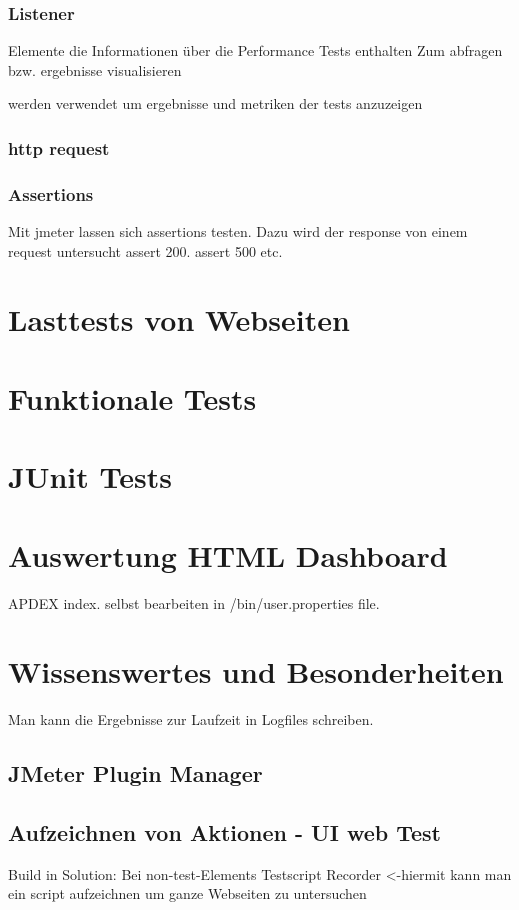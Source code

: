 \documentclass[a4paper,12pt]{article}
\begin{document}
\subsubsection{Listener}
Elemente die Informationen über die Performance Tests enthalten
Zum abfragen bzw. ergebnisse visualisieren

werden verwendet um ergebnisse und metriken der tests anzuzeigen

\subsubsection{http request}
\subsubsection{Assertions}
Mit jmeter lassen sich assertions testen. Dazu wird der response von einem request untersucht assert 200. assert 500 etc.

\section{Lasttests von Webseiten}

\section{Funktionale Tests}

\section{JUnit Tests}
\label{chap:junit_tests}

\section{Auswertung HTML Dashboard}
\label{chap:html_dashboard}
APDEX index. selbst bearbeiten in /bin/user.properties file.

\section{Wissenswertes und Besonderheiten}
Man kann die Ergebnisse zur Laufzeit in Logfiles schreiben.

\subsection{JMeter Plugin Manager}



\subsection{Aufzeichnen von Aktionen - UI web Test}
Build in Solution:
Bei non-test-Elements Testscript Recorder <-hiermit kann man ein script aufzeichnen um ganze Webseiten zu untersuchen
\end{document}
